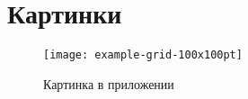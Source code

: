 \chapter{Картинки}
\label{cha:appendix1}

\blindtext

\begin{figure}
    \centering
    \texttt{[image: example-grid-100x100pt]}
    \caption{Картинка в приложении}
\end{figure}
